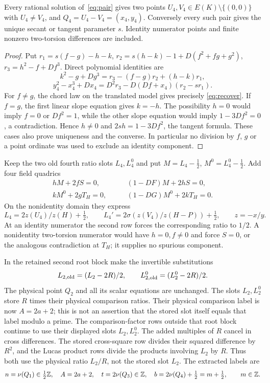 \documentclass[11pt,a4paper]{article}
\begin{document}
\begin{lemma}\label{lem:pair}
Every rational solution of~\eqref{eq:pair} gives two points
$U_4,V_4\in E(K)\setminus\{(0,0)\}$ with $U_4\ne V_4$, and
$Q_4=U_4-V_4=(x_4,y_4)$. Conversely every such pair gives the unique
secant or tangent parameter $s$. Identity numerator points and finite
nonzero two-torsion differences are included.
\end{lemma}
\begin{proof}
Put $r_1=s(f-g)-h-k$, $r_2=s(h-k)-1+D(f^2+fg+g^2)$,
$r_3=h^2-f+Df^3$. Direct polynomial identities are
\[
 k^2-g+Dg^3=r_3-(f-g)r_2+(h-k)r_1,
\]
\[
 y_4^2-x_4^3+Dx_4=D^2r_3-D(Df+x_4)(r_2-sr_1).
\]
For $f\ne g$, the chord law on the translated model gives precisely
\eqref{eq:recover}. If $f=g$, the first linear slope equation gives
$k=-h$. The possibility $h=0$ would imply $f=0$ or $Df^2=1$, while
the other slope equation would imply $1-3Df^2=0$, a contradiction.
Hence $h\ne0$ and $2sh=1-3Df^2$, the tangent formula. These cases
also prove uniqueness and the converse. In particular no division by
$f$, $g$ or a point ordinate was used to exclude an identity component.
\end{proof}

Keep the two old fourth ratio slots $L_4,L_4^0$ and put
$M=L_4-\tfrac12$, $M^0=L_4^0-\tfrac12$. Add four field quadrics
\begin{equation}\label{eq:ratios}
 \begin{split}
 hM+2fS=0,&\qquad (1-DF)M+2hS=0,\\
 kM^0+2gT_H=0,&\qquad (1-DG)M^0+2kT_H=0.
 \end{split}
\end{equation}
On the nonidentity domain they express
\[
 L_4=2z(U_4)/z(H)+\tfrac12,\qquad
 L_4'=2\sigma(z(V_4)/z(H-P))+\tfrac12,\qquad z=-x/y.
\]
At an identity numerator the second row forces the corresponding ratio
to $1/2$. A nonidentity two-torsion numerator would have $h=0,f\ne0$
and force $S=0$, or the analogous contradiction at $T_H$; it supplies
no spurious component.

In the retained second root block make the invertible substitutions
\begin{equation}\label{eq:affine}
 L_{2,\rm old}=(L_2-2R)/2,\qquad
 L_{2,\rm old}^0=(L_2^0-2R)/2.
\end{equation}
The physical point $Q_2$ and all its scalar equations are unchanged.
The slots $L_2,L_2^0$ store $R$ times their physical comparison
ratios. Their physical comparison label is now $A=2a+2$; this is not
an assertion that the stored slot itself equals that label modulo a prime. The comparison-factor rows outside
that root block continue to use their displayed slots $L_2,L_2^0$.
The added multiples of $R$ cancel in cross differences. The stored
cross-square row divides their squared difference by $R^2$, and the
Lucas product rows divide the products involving $L_2$ by $R$. Thus
both use the physical ratio $L_2/R$, not the stored slot $L_2$. The extracted labels are
\[
 n=\nu(Q_1)\in\tfrac12\mathbb Z,\quad A=2a+2,\quad
 t=2\nu(Q_3)\in\mathbb Z,\quad b=2\nu(Q_4)+\tfrac12=m+\tfrac12,
 \qquad m\in\mathbb Z.
\]
\end{document}
